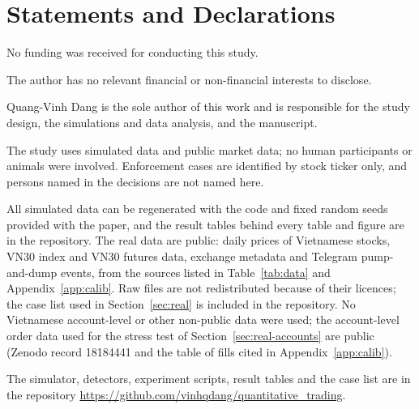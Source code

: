 \documentclass[pdflatex,sn-basic]{sn-jnl}
\theoremstyle{thmstyleone}%
\begin{document}
\section*{Statements and Declarations}

No funding was received for conducting this study.

The author has no relevant financial or non-financial interests to disclose.

Quang-Vinh Dang is the sole author of this work and is responsible for the study design, the simulations and data analysis, and the manuscript.

The study uses simulated data and public market data; no human participants or animals were involved. Enforcement cases are identified by stock ticker only, and persons named in the decisions are not named here.

All simulated data can be regenerated with the code and fixed random seeds provided with the paper, and the result tables behind every table and figure are in the repository. The real data are public: daily prices of Vietnamese stocks, VN30 index and VN30 futures data, exchange metadata and Telegram pump-and-dump events, from the sources listed in Table~\ref{tab:data} and Appendix~\ref{app:calib}. Raw files are not redistributed because of their licences; the case list used in Section~\ref{sec:real} is included in the repository. No Vietnamese account-level or other non-public data were used; the account-level order data used for the stress test of Section~\ref{sec:real-accounts} are public (Zenodo record 18184441 and the table of fills cited in Appendix~\ref{app:calib}).

The simulator, detectors, experiment scripts, result tables and the case list are in the repository \url{https://github.com/vinhqdang/quantitative_trading}.
\end{document}
